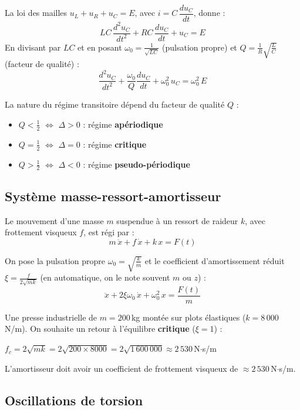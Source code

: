 \documentclass[a4paper,11pt]{article}
\begin{document}
La loi des mailles $u_L + u_R + u_C = E$, avec $i = C\,\dfrac{du_C}{dt}$, donne :
\[
LC\,\frac{d^2u_C}{dt^2} + RC\,\frac{du_C}{dt} + u_C = E
\]
En divisant par $LC$ et en posant $\omega_0 = \frac{1}{\sqrt{LC}}$ (pulsation propre) et $Q = \frac{1}{R}\sqrt{\frac{L}{C}}$ (facteur de qualité) :
\[
\frac{d^2u_C}{dt^2} + \frac{\omega_0}{Q}\frac{du_C}{dt} + \omega_0^2\,u_C = \omega_0^2\,E
\]

\begin{remarque}
La nature du régime transitoire dépend du facteur de qualité $Q$ :
\begin{itemize}
  \item $Q < \frac{1}{2}$ $\Leftrightarrow$ $\Delta > 0$ : régime \textbf{apériodique}
  \item $Q = \frac{1}{2}$ $\Leftrightarrow$ $\Delta = 0$ : régime \textbf{critique}
  \item $Q > \frac{1}{2}$ $\Leftrightarrow$ $\Delta < 0$ : régime \textbf{pseudo-périodique}
\end{itemize}
\end{remarque}

\subsection{Système masse-ressort-amortisseur}

Le mouvement d'une masse $m$ suspendue à un ressort de raideur $k$, avec frottement visqueux $f$, est régi par :
\[
m\,\ddot{x} + f\,\dot{x} + k\,x = F(t)
\]

On pose la pulsation propre $\omega_0 = \sqrt{\frac{k}{m}}$ et le coefficient d'amortissement réduit $\xi = \frac{f}{2\sqrt{mk}}$ (en automatique, on le note souvent $m$ ou $z$) :
\[
\ddot{x} + 2\xi\omega_0\,\dot{x} + \omega_0^2\,x = \frac{F(t)}{m}
\]

\begin{appliindus}
Une presse industrielle de $m = 200\,$kg montée sur plots élastiques ($k = 8\,000\,$N/m). On souhaite un retour à l'équilibre \textbf{critique} ($\xi = 1$) :

$f_c = 2\sqrt{mk} = 2\sqrt{200 \times 8000} = 2\sqrt{1\,600\,000} \approx 2\,530\,$N$\cdot$s/m

L'amortisseur doit avoir un coefficient de frottement visqueux de $\approx 2\,530\,$N$\cdot$s/m.
\end{appliindus}

\subsection{Oscillations de torsion}
\end{document}
